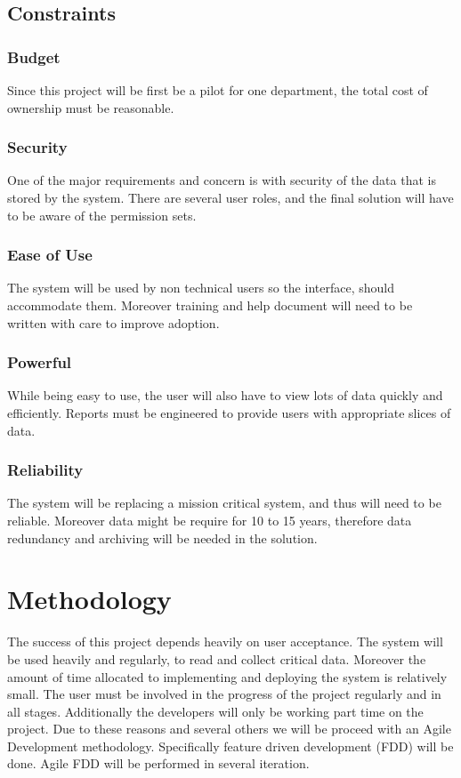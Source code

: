 \documentclass{journal}
\begin{document}
\subsection{ Constraints }
\subsubsection{ Budget }
Since this project will be first be a pilot for one department, the total cost of ownership must be reasonable.
\subsubsection{Security}
One of the major requirements and concern is with security of the data that is stored by the system. There are several user roles, and the final solution will have to be aware of the permission sets. 
\subsubsection{ Ease of Use }
The system will be used by non technical users so the interface, should accommodate them. Moreover training and help document will need to be written with care to improve adoption. 
\subsubsection{ Powerful }
While being easy to use, the user will also have to view lots of data quickly and efficiently. Reports must be engineered to provide users with appropriate slices of data. 
\subsubsection{ Reliability }
The system will be replacing a mission critical system, and thus will need to be reliable. Moreover data might be require for 10 to 15 years, therefore data redundancy and archiving will be needed in the solution. 
\section{Methodology}

The success of this project depends heavily on user acceptance. The system will be used heavily and regularly, to read and collect critical data. Moreover the amount of time allocated to implementing and deploying 
the system is relatively small. The user must be involved in the progress of the project regularly and in all stages. Additionally the developers will only be working part time on the project. Due to these reasons and several others we will be proceed with an Agile Development methodology. Specifically
feature driven development (FDD) will be done. Agile FDD will be performed in several iteration. 
\end{document}
